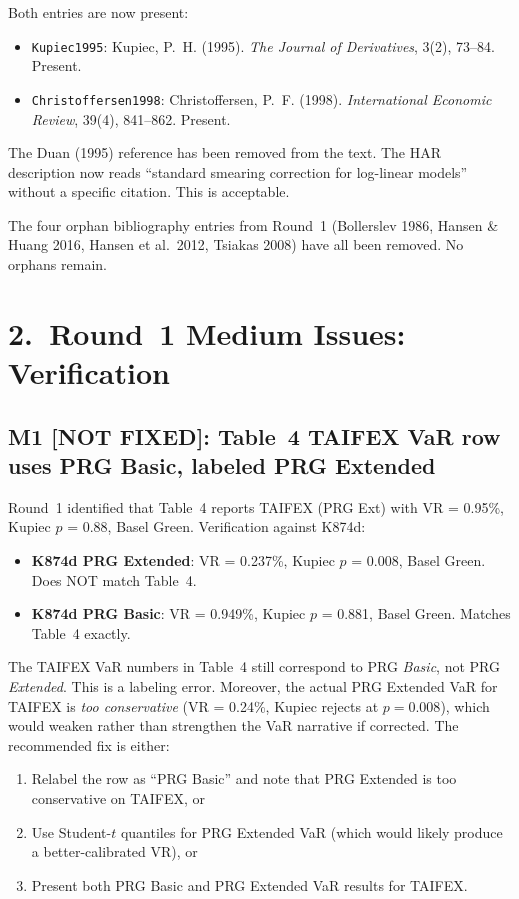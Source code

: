 \documentclass[12pt,a4paper]{article}
\begin{document}
Both entries are now present:
\begin{itemize}[nosep]
\item \texttt{Kupiec1995}: Kupiec, P.~H. (1995). \emph{The Journal of Derivatives}, 3(2), 73--84. \textcolor{okgreen}{Present.}
\item \texttt{Christoffersen1998}: Christoffersen, P.~F. (1998). \emph{International Economic Review}, 39(4), 841--862. \textcolor{okgreen}{Present.}
\end{itemize}

The Duan (1995) reference has been removed from the text. The HAR description now reads ``standard smearing correction for log-linear models'' without a specific citation. This is acceptable.

The four orphan bibliography entries from Round~1 (Bollerslev 1986, Hansen \& Huang 2016, Hansen et al.\ 2012, Tsiakas 2008) have all been removed. \textcolor{okgreen}{No orphans remain.}


\section*{2.\ Round~1 Medium Issues: Verification}

\subsection*{\textcolor{errorred}{M1 [NOT FIXED]: Table~4 TAIFEX VaR row uses PRG Basic, labeled PRG Extended}}

Round~1 identified that Table~4 reports TAIFEX (PRG Ext) with VR = 0.95\%, Kupiec $p$ = 0.88, Basel Green. Verification against K874d:

\begin{itemize}[nosep]
\item \textbf{K874d PRG Extended}: VR = 0.237\%, Kupiec $p$ = 0.008, Basel Green. \textcolor{errorred}{Does NOT match Table~4.}
\item \textbf{K874d PRG Basic}: VR = 0.949\%, Kupiec $p$ = 0.881, Basel Green. \textcolor{okgreen}{Matches Table~4 exactly.}
\end{itemize}

The TAIFEX VaR numbers in Table~4 still correspond to PRG \emph{Basic}, not PRG \emph{Extended}. This is a labeling error. Moreover, the actual PRG Extended VaR for TAIFEX is \emph{too conservative} (VR = 0.24\%, Kupiec rejects at $p = 0.008$), which would weaken rather than strengthen the VaR narrative if corrected. The recommended fix is either:
\begin{enumerate}[nosep]
\item Relabel the row as ``PRG Basic'' and note that PRG Extended is too conservative on TAIFEX, or
\item Use Student-$t$ quantiles for PRG Extended VaR (which would likely produce a better-calibrated VR), or
\item Present both PRG Basic and PRG Extended VaR results for TAIFEX.
\end{enumerate}
\end{document}
